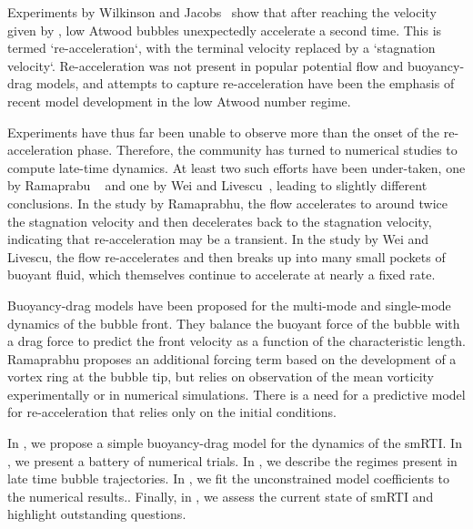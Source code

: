 Experiments by Wilkinson and Jacobs~\cite{Wilkinson2007} show that after reaching the velocity given by , low Atwood bubbles unexpectedly accelerate a second time.
This is termed `re-acceleration`, with the terminal velocity replaced by a `stagnation velocity`.
Re-acceleration was not present in popular potential flow and buoyancy-drag models, and attempts to capture re-acceleration have been the emphasis of recent model development in the low Atwood number regime.

Experiments have thus far been unable to observe more than the onset of the re-acceleration phase.
Therefore, the community has turned to numerical studies to compute late-time dynamics.
At least two such efforts have been under-taken, one by Ramaprabu \etal~\cite{Ramaprabhu2012} and one by Wei and Livescu~\cite{Wei2012}, leading to slightly different conclusions.
In the study by Ramaprabhu, the flow accelerates to around twice the stagnation velocity and then decelerates back to the stagnation velocity, indicating that re-acceleration may be a transient.
In the study by Wei and Livescu, the flow re-accelerates and then breaks up into many small pockets of buoyant fluid, which themselves continue to accelerate at nearly a fixed rate.

Buoyancy-drag models have been proposed for the multi-mode and single-mode dynamics of the bubble front.
They balance the buoyant force of the bubble with a drag force to predict the front velocity as a function of the characteristic length.
Ramaprabhu proposes an additional forcing term based on the development of a vortex ring at the bubble tip, but relies on observation of the mean vorticity experimentally or in numerical simulations.
There is a need for a predictive model for re-acceleration that relies only on the initial conditions.

In , we propose a simple buoyancy-drag model for the dynamics of the smRTI.
In , we present a battery of numerical trials.
In , we describe the regimes present in late time bubble trajectories.
In , we fit the unconstrained model coefficients to the numerical results..
Finally, in , we assess the current state of smRTI and highlight outstanding questions.

